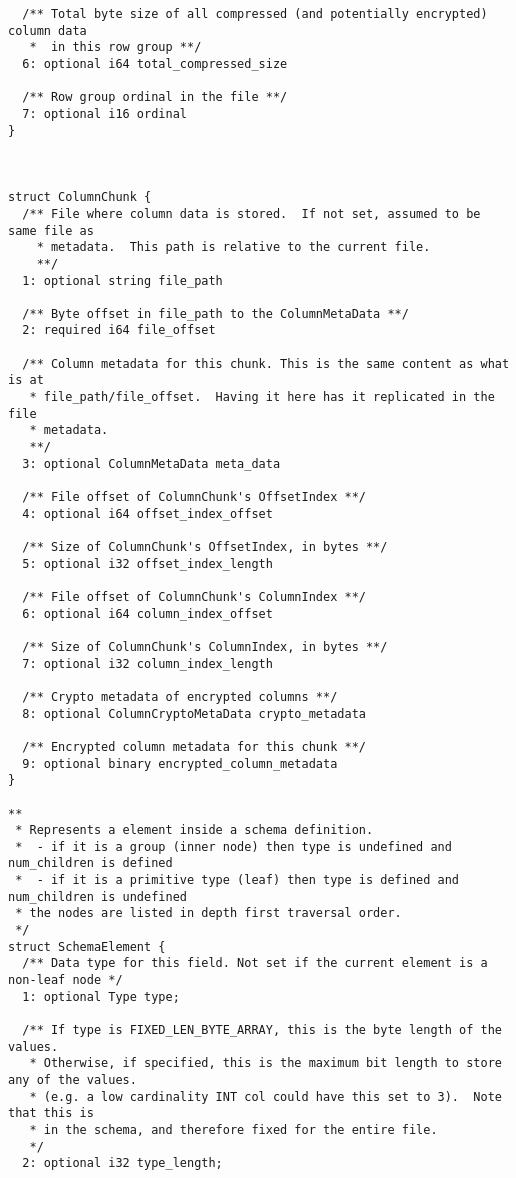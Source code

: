 \documentclass[manuscript]{acmart}
\begin{document}
\begin{verbatim}
  /** Total byte size of all compressed (and potentially encrypted) column data
   *  in this row group **/
  6: optional i64 total_compressed_size

  /** Row group ordinal in the file **/
  7: optional i16 ordinal
}



struct ColumnChunk {
  /** File where column data is stored.  If not set, assumed to be same file as
    * metadata.  This path is relative to the current file.
    **/
  1: optional string file_path

  /** Byte offset in file_path to the ColumnMetaData **/
  2: required i64 file_offset

  /** Column metadata for this chunk. This is the same content as what is at
   * file_path/file_offset.  Having it here has it replicated in the file
   * metadata.
   **/
  3: optional ColumnMetaData meta_data

  /** File offset of ColumnChunk's OffsetIndex **/
  4: optional i64 offset_index_offset

  /** Size of ColumnChunk's OffsetIndex, in bytes **/
  5: optional i32 offset_index_length

  /** File offset of ColumnChunk's ColumnIndex **/
  6: optional i64 column_index_offset

  /** Size of ColumnChunk's ColumnIndex, in bytes **/
  7: optional i32 column_index_length

  /** Crypto metadata of encrypted columns **/
  8: optional ColumnCryptoMetaData crypto_metadata

  /** Encrypted column metadata for this chunk **/
  9: optional binary encrypted_column_metadata
}

**
 * Represents a element inside a schema definition.
 *  - if it is a group (inner node) then type is undefined and num_children is defined
 *  - if it is a primitive type (leaf) then type is defined and num_children is undefined
 * the nodes are listed in depth first traversal order.
 */
struct SchemaElement {
  /** Data type for this field. Not set if the current element is a non-leaf node */
  1: optional Type type;

  /** If type is FIXED_LEN_BYTE_ARRAY, this is the byte length of the values.
   * Otherwise, if specified, this is the maximum bit length to store any of the values.
   * (e.g. a low cardinality INT col could have this set to 3).  Note that this is
   * in the schema, and therefore fixed for the entire file.
   */
  2: optional i32 type_length;


\end{verbatim}
\end{document}
